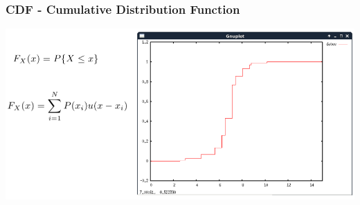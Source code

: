 \documentclass{beamer}
\begin{document}
\begin{frame}
\frametitle{CDF - Cumulative Distribution Function}
\begin{center}
\includegraphics[scale=0.35]{cdf1}
\end{center}
\end{frame}
\end{document}

